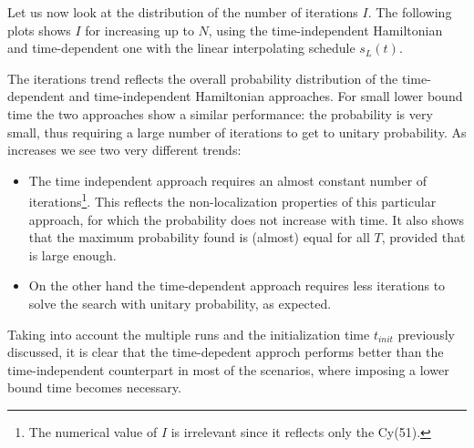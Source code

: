         \noindent
        Let us now look at the distribution of the number of iterations $I$. The following plots shows $I$ for increasing \tmin up to $N$, using the time-independent Hamiltonian and time-dependent one with the linear interpolating schedule $s_L(t)$.

        

        The iterations trend reflects the overall probability distribution of the time-dependent and time-independent Hamiltonian approaches. For small lower bound time the two approaches show a similar performance: the probability is very small, thus requiring a large number of iterations to get to unitary probability. As \tmin increases we see two very different trends:
        \begin{itemize}
            \item The time independent approach requires an almost constant number of iterations\footnote{The numerical value of $I$ is irrelevant since it reflects only the Cy(51).}. This reflects the non-localization properties of this particular approach, for which the probability does not increase with time. It also shows that the maximum probability found is (almost) equal for all $T$, provided that \tmin is large enough.
            \item On the other hand the time-dependent approach requires less iterations to solve the search with unitary probability, as expected.
        \end{itemize}
        Taking into account the multiple runs  and the initialization time $t_{init}$ previously discussed, it is clear that the time-depedent approch performs better than the time-independent counterpart in most of the scenarios, where imposing a lower bound time \tmin becomes necessary.

